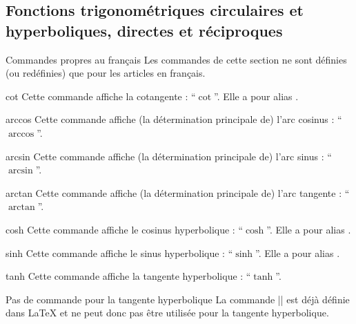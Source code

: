 \documentclass[french,nolocaltoc]{nwejmart}
\newtheorem[title=Fait,style=definition]{fact}
\begin{document}
\subsection[Fonctions trigonométriques circulaires et hyperboliques]{Fonctions
  trigonométriques circulaires et hyperboliques, directes et réciproques}

\begin{dbremark}{Commandes propres au français}{}
  Les commandes de cette section ne sont définies (ou redéfinies) que pour les
  articles en français.
\end{dbremark}

\begin{docCommand}{cot}{}
  Cette commande affiche la cotangente : \enquote{$\cot$}. Elle a pour alias
  .
\end{docCommand}

\begin{docCommand}{arccos}{}
  Cette commande affiche (la détermination principale de) l'arc cosinus :
  \enquote{$\arccos$}.
\end{docCommand}

\begin{docCommand}{arcsin}{}
  Cette commande affiche (la détermination principale de) l'arc sinus :
  \enquote{$\arcsin$}.
\end{docCommand}

\begin{docCommand}{arctan}{}
  Cette commande affiche (la détermination principale de) l'arc tangente :
  \enquote{$\arctan$}.
\end{docCommand}

\begin{docCommand}{cosh}{}
  Cette commande affiche le cosinus hyperbolique : \enquote{$\cosh$}. Elle a pour
  alias .
\end{docCommand}

\begin{docCommand}{sinh}{}
  Cette commande affiche le sinus hyperbolique : \enquote{$\sinh$}. Elle a pour
  alias .
\end{docCommand}

\begin{docCommand}{tanh}{}
  Cette commande affiche la tangente hyperbolique : \enquote{$\tanh$}.
  \begin{dbremark}{Pas de commande \protect{} pour la tangente hyperbolique}{}
    La commande |\th| est déjà définie dans \LaTeX{} et ne peut donc pas être
    utilisée pour la tangente hyperbolique.
  \end{dbremark}
\end{docCommand}
\end{document}
